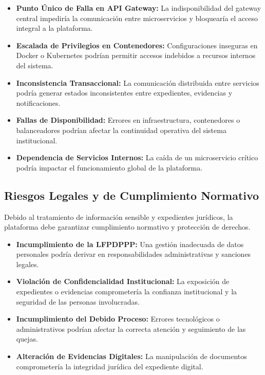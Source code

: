\documentclass[12pt,oneside,letterpaper]{book}
\begin{document}
\begin{itemize}

\item \textbf{Punto Único de Falla en API Gateway:}
La indisponibilidad del gateway central impediría la comunicación entre microservicios y bloquearía el acceso integral a la plataforma.

\item \textbf{Escalada de Privilegios en Contenedores:}
Configuraciones inseguras en Docker o Kubernetes podrían permitir accesos indebidos a recursos internos del sistema.

\item \textbf{Inconsistencia Transaccional:}
La comunicación distribuida entre servicios podría generar estados inconsistentes entre expedientes, evidencias y notificaciones.

\item \textbf{Fallas de Disponibilidad:}
Errores en infraestructura, contenedores o balanceadores podrían afectar la continuidad operativa del sistema institucional.

\item \textbf{Dependencia de Servicios Internos:}
La caída de un microservicio crítico podría impactar el funcionamiento global de la plataforma.

\end{itemize}


\subsection{Riesgos Legales y de Cumplimiento Normativo}

Debido al tratamiento de información sensible y expedientes jurídicos, la plataforma debe garantizar cumplimiento normativo y protección de derechos.

\begin{itemize}

\item \textbf{Incumplimiento de la LFPDPPP:}
Una gestión inadecuada de datos personales podría derivar en responsabilidades administrativas y sanciones legales.

\item \textbf{Violación de Confidencialidad Institucional:}
La exposición de expedientes o evidencias comprometería la confianza institucional y la seguridad de las personas involucradas.

\item \textbf{Incumplimiento del Debido Proceso:}
Errores tecnológicos o administrativos podrían afectar la correcta atención y seguimiento de las quejas.

\item \textbf{Alteración de Evidencias Digitales:}
La manipulación de documentos comprometería la integridad jurídica del expediente digital.

\end{itemize}
\end{document}
